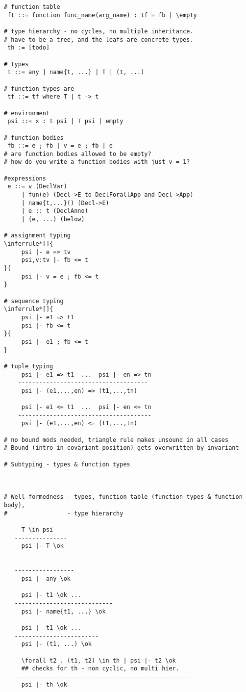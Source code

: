 \documentclass{report} %
\begin{document}
\begin{verbatim}
# function table
 ft ::= function func_name(arg_name) : tf = fb | \empty

# type hierarchy - no cycles, no multiple inheritance. 
# have to be a tree, and the leafs are concrete types.
 th := [todo]

# types
 t ::= any | name{t, ...} | T | (t, ...)

# function types are
 tf ::= tf where T | t -> t

# environment
 psi ::= x : t psi | T psi | empty

# function bodies
 fb ::= e ; fb | v = e ; fb | e 
# are function bodies allowed to be empty? 
# how do you write a function bodies with just v = 1?

#expressions
 e ::= v (DeclVar)
     | fun(e) (Decl->E to DeclForallApp and Decl->App)
     | name{t,...}() (Decl->E)
     | e :: t (DeclAnno)
     | (e, ...) (below)

# assignment typing
\inferrule*[]{
     psi |- e => tv
     psi,v:tv |- fb <= t
}{
     psi |- v = e ; fb <= t
}

# sequence typing
\inferrule*[]{
     psi |- e1 => t1
     psi |- fb <= t
}{
     psi |- e1 ; fb <= t
}

# tuple typing
     psi |- e1 => t1  ...  psi |- en => tn
    -------------------------------------
     psi |- (e1,...,en) => (t1,...,tn)

     psi |- e1 <= t1  ...  psi |- en <= tn
    --------------------------------------
     psi |- (e1,...,en) <= (t1,...,tn)

# no bound mods needed, triangle rule makes unsound in all cases
# Bound (intro in covariant position) gets overwritten by invariant

# Subtyping - types & function types



# Well-formedness - types, function table (function types & function body),
#                 - type hierarchy

     T \in psi
   ---------------
     psi |- T \ok

     
   -----------------
     psi |- any \ok

     psi |- t1 \ok ...
   ----------------------------
     psi |- name{t1, ...} \ok

     psi |- t1 \ok ...
   ------------------------
     psi |- (t1, ...) \ok 

     \forall t2 . (t1, t2) \in th | psi |- t2 \ok
     ## checks for th - non cyclic, no multi hier.
   --------------------------------------------------
     psi |- th \ok 



\end{verbatim}
\end{document}
